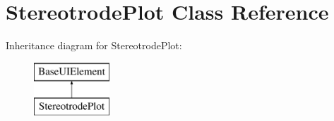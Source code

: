 \hypertarget{classStereotrodePlot}{\section{Stereotrode\-Plot Class Reference}
\label{classStereotrodePlot}
}
Inheritance diagram for Stereotrode\-Plot\-:\begin{figure}[H]
\begin{center}
\leavevmode
\includegraphics[height=2.000000cm]{classStereotrodePlot}
\end{center}
\end{figure}
